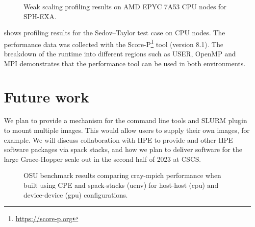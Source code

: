 \begin{figure}[htp!]
    \begin{center}
        
    \end{center}
    \caption{Weak scaling profiling results on AMD EPYC 7A53 CPU nodes for SPH-EXA.}
    \label{fig:sph-weak-scorep}
\end{figure}

 shows profiling results for the Sedov--Taylor test case on CPU nodes.
The performance data was collected with the Score-P\footnote{\url{https://score-p.org}} tool (version 8.1).
The breakdown of the runtime into different regions such as USER, OpenMP and MPI demonstrates that the performance tool can be used in both environments.


\vfill\eject

\section{Future work}

We plan to provide a mechanism for the command line tools and SLURM plugin to mount multiple images.
This would allow users to supply their own images, for example.
We will discuss collaboration with HPE to provide \craympich and other HPE software packages via spack stacks, and how we plan to deliver software for the large Grace-Hopper scale out in the second half of 2023 at CSCS.

\begin{figure*}[htp!]
    \begin{center}
        
        \hfill
        \newline
        
        \hfill
        \newline
        
        \hfill
    \end{center}
    \caption{OSU benchmark results comparing cray-mpich performance when built using CPE and spack-stacks (uenv) for host-host (cpu) and device-device (gpu) configurations.}
    \label{fig:osu}
\end{figure*}

